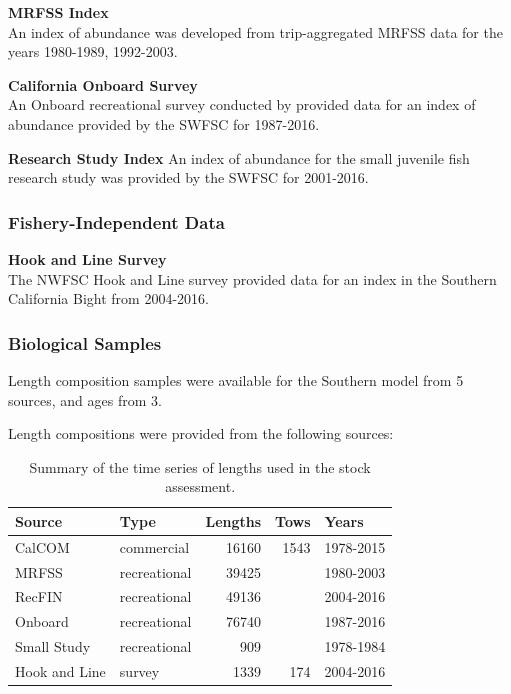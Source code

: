\documentclass[12pt,]{article}
\begin{document}
\textbf{MRFSS Index}\\
An index of abundance was developed from trip-aggregated MRFSS data for
the years 1980-1989, 1992-2003.

\textbf{California Onboard Survey}\\
An Onboard recreational survey conducted by provided data for an index
of abundance provided by the SWFSC for 1987-2016.

\textbf{Research Study Index} An index of abundance for the small
juvenile fish research study was provided by the SWFSC for 2001-2016.

\subsubsection{Fishery-Independent
Data}\label{fishery-independent-data-1}

\textbf{Hook and Line Survey}\\
The NWFSC Hook and Line survey provided data for an index in the
Southern California Bight from 2004-2016.

\subsubsection{Biological Samples}\label{biological-samples-1}

Length composition samples were available for the Southern model from 5
sources, and ages from 3.

Length compositions were provided from the following sources:

\vspace{.5cm}

\begin{table}[ht]
\centering
\caption{Summary of the time series of lengths used in the stock assessment.} 
\label{tab:Length_sources_South}
\begin{tabular}{llrrl}
  \hline
Source & Type & Lengths & Tows & Years \\ 
  \hline
CalCOM & commercial & 16160 & 1543 & 1978-2015 \\ 
  MRFSS & recreational & 39425 &  & 1980-2003 \\ 
  RecFIN & recreational & 49136 &  & 2004-2016 \\ 
  Onboard & recreational & 76740 &  & 1987-2016 \\ 
  Small Study & recreational & 909 &  & 1978-1984 \\ 
  Hook and Line & survey & 1339 & 174 & 2004-2016 \\ 
   \hline
\end{tabular}
\end{table}
\end{document}
